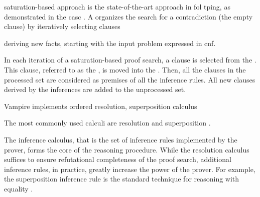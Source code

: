 \Gls{saturation}-based approach is the state-of-the-art approach in \gls{fol} \gls{tping}, as demonstrated in the \gls{casc} \cite{Sut16}.
A  organizes the search for a contradiction
(the empty clause)
by iteratively selecting clauses

deriving new facts,
starting with the input problem expressed in \gls{cnf}.

In each iteration of a saturation-based proof search,
a clause is selected from the .
This clause, referred to as the , is moved into the .
Then, all the clauses in the processed set are considered as premises of all the inference rules.
All new clauses derived by the inferences are added to the unprocessed set.

Vampire implements ordered resolution, superposition calculus


The most commonly used calculi are resolution \cite{} and superposition \cite{}.

The inference calculus, that is the set of inference rules implemented by the prover, forms the core of the reasoning procedure.
While the resolution calculus suffices to ensure refutational completeness of the proof search,
additional inference rules, in practice, greatly increase the power of the prover.
For example, the superposition inference rule is the standard technique for reasoning with equality \cite{}.



